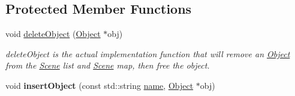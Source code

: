 \subsection*{Protected Member Functions}
\begin{DoxyCompactItemize}
\item 
void \hyperlink{class_scene_ad3897f8ac658af62c133783b2c4eaee4}{delete\-Object} (\hyperlink{class_object}{Object} $\ast$obj)
\begin{DoxyCompactList}\small\item\em delete\-Object is the actual implementation function that will remove an \hyperlink{class_object}{Object} from the \hyperlink{class_scene}{Scene} list and \hyperlink{class_scene}{Scene} map, then free the object. \end{DoxyCompactList}\item 
\hypertarget{class_scene_ab64354bd8059bab589ca2dbf9de9e66c}{void {\bfseries insert\-Object} (const std\-::string \hyperlink{class_object_aafd766fce2598f718cac97a3ac731706}{name}, \hyperlink{class_object}{Object} $\ast$obj)}\label{class_scene_ab64354bd8059bab589ca2dbf9de9e66c}

\end{DoxyCompactItemize}
